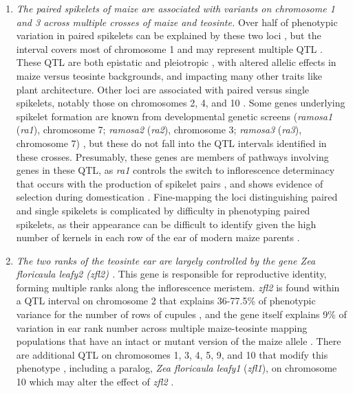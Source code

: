 \documentclass[9pt,twocolumn,twoside]{rilabRxiv}
\begin{document}
\begin{enumerate}

 \item \textit{The paired spikelets of maize are associated with variants on chromosome 1 and 3 across multiple crosses of maize and teosinte.}
 Over half of phenotypic variation in paired spikelets can be explained by these two loci \citep{doebley1991, doebley1993}, but the interval covers most of chromosome 1 and may represent multiple QTL \citep{doebley1993}.
 These QTL are both epistatic and pleiotropic \citep{doebley1995}, with altered allelic effects in maize versus teosinte backgrounds, and impacting many other traits like plant architecture.
 Other loci are associated with paired versus single spikelets, notably those on chromosomes 2, 4, and 10 \citep{doebley1991, doebley1993}.
  Some genes underlying spikelet formation are known from developmental genetic screens (\textit{ramosa1} (\textit{ra1}), chromosome 7; \textit{ramosa2} (\textit{ra2}), chromosome 3; \textit{ramosa3} (\textit{ra3}), chromosome 7) \citep{vollbrecht2005, mcsteen2006}, but these do not fall into the QTL intervals identified in these crosses.
 Presumably, these genes are members of pathways involving genes in these QTL, as \textit{ra1} controls the switch to inflorescence determinacy that occurs with the production of spikelet pairs \citep{vollbrecht2005}, and shows evidence of selection during domestication \citep{sigmon2010}.
Fine-mapping the loci distinguishing paired and single spikelets is complicated by difficulty in phenotyping paired spikelets, as their appearance can be difficult to identify given the high number of kernels in each row of the ear of modern maize parents \citep{galinat1988}.


\item \textit{The two ranks of the teosinte ear are largely controlled by the gene \textit{Zea floricaula leafy2} (\textit{zfl2}) \citep{bomblies2006}. }
 This gene is responsible for reproductive identity, forming multiple ranks along the inflorescence meristem.
 \textit{zfl2} is found within a QTL interval on chromosome 2 that explains 36-77.5\% of phenotypic variance for the number of rows of cupules \citep{doebley1991, doebley1993}, and the gene itself explains 9\% of variation in ear rank number across multiple maize-teosinte mapping populations that have an intact or mutant version of the maize allele \citep{bomblies2006}.
 There are additional QTL on chromosomes 1, 3, 4, 5, 9, and 10  that modify this phenotype \citep{doebley1991, doebley1993, briggs2007}, including a paralog, \textit{Zea floricaula leafy1} (\textit{zfl1}), on chromosome 10 \citep{briggs2007} which may alter the effect of \textit{zfl2} \citep{bomblies2006}.


\end{enumerate}
\end{document}

